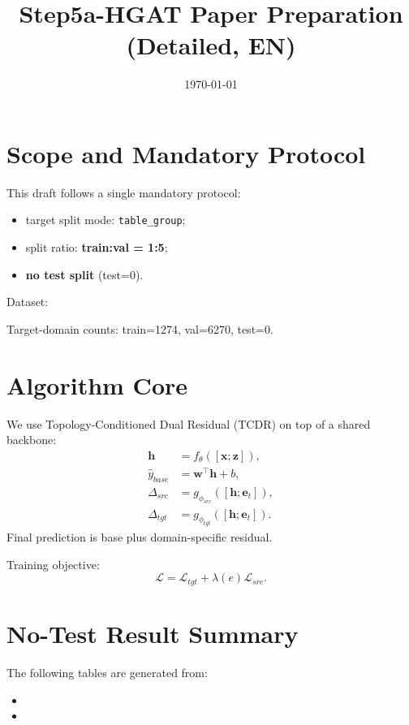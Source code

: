 \documentclass[11pt,a4paper]{article}
\title{Step5a-HGAT Paper Preparation (Detailed, EN)}
\author{}
\date{\today}
\begin{document}
\maketitle

\section{Scope and Mandatory Protocol}
This draft follows a single mandatory protocol:
\begin{itemize}
  \item target split mode: \texttt{table\_group};
  \item split ratio: \textbf{train:val = 1:5};
  \item \textbf{no test split} (test=0).
\end{itemize}

Dataset:
\begin{center}
\end{center}
Target-domain counts: train=1274, val=6270, test=0.

\section{Algorithm Core}
We use Topology-Conditioned Dual Residual (TCDR) on top of a shared backbone:
\begin{align}
\mathbf{h} &= f_{\theta}([\mathbf{x};\mathbf{z}]), \\
\hat{y}_{base} &= \mathbf{w}^{\top}\mathbf{h} + b, \\
\Delta_{src} &= g_{\phi_{src}}([\mathbf{h};\mathbf{e}_t]), \\
\Delta_{tgt} &= g_{\phi_{tgt}}([\mathbf{h};\mathbf{e}_t]).
\end{align}
Final prediction is base plus domain-specific residual.

Training objective:
\begin{equation}
\mathcal{L} = \mathcal{L}_{tgt} + \lambda(e)\mathcal{L}_{src}.
\end{equation}

\section{No-Test Result Summary}
The following tables are generated from:
\begin{itemize}
  \item {}
  \item {}
\end{itemize}
\end{document}
